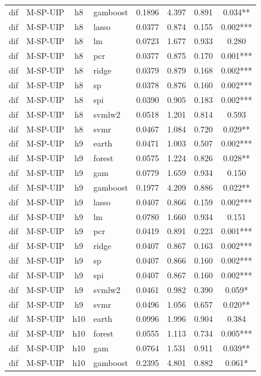 \begin{ThreePartTable}
\begin{longtable}[t]{llclcccc}
dif & M-SP-UIP & h8 & gamboost & 0.1896 & 4.397 & 0.891 & 0.034**\\
dif & M-SP-UIP & h8 & lasso & 0.0377 & 0.874 & 0.155 & 0.002***\\
dif & M-SP-UIP & h8 & lm & 0.0723 & 1.677 & 0.933 & 0.280\\
dif & M-SP-UIP & h8 & pcr & 0.0377 & 0.875 & 0.170 & 0.001***\\
dif & M-SP-UIP & h8 & ridge & 0.0379 & 0.879 & 0.168 & 0.002***\\
dif & M-SP-UIP & h8 & sp & 0.0378 & 0.876 & 0.160 & 0.002***\\
dif & M-SP-UIP & h8 & spi & 0.0390 & 0.905 & 0.183 & 0.002***\\
dif & M-SP-UIP & h8 & svmlw2 & 0.0518 & 1.201 & 0.814 & 0.593\\
dif & M-SP-UIP & h8 & svmr & 0.0467 & 1.084 & 0.720 & 0.029**\\
\addlinespace
dif & M-SP-UIP & h9 & earth & 0.0471 & 1.003 & 0.507 & 0.002***\\
dif & M-SP-UIP & h9 & forest & 0.0575 & 1.224 & 0.826 & 0.028**\\
dif & M-SP-UIP & h9 & gam & 0.0779 & 1.659 & 0.934 & 0.150\\
dif & M-SP-UIP & h9 & gamboost & 0.1977 & 4.209 & 0.886 & 0.022**\\
dif & M-SP-UIP & h9 & lasso & 0.0407 & 0.866 & 0.159 & 0.002***\\
dif & M-SP-UIP & h9 & lm & 0.0780 & 1.660 & 0.934 & 0.151\\
dif & M-SP-UIP & h9 & pcr & 0.0419 & 0.891 & 0.223 & 0.001***\\
dif & M-SP-UIP & h9 & ridge & 0.0407 & 0.867 & 0.163 & 0.002***\\
dif & M-SP-UIP & h9 & sp & 0.0407 & 0.866 & 0.160 & 0.002***\\
dif & M-SP-UIP & h9 & spi & 0.0407 & 0.867 & 0.160 & 0.002***\\
dif & M-SP-UIP & h9 & svmlw2 & 0.0461 & 0.982 & 0.390 & 0.059*\\
dif & M-SP-UIP & h9 & svmr & 0.0496 & 1.056 & 0.657 & 0.020**\\
\addlinespace
dif & M-SP-UIP & h10 & earth & 0.0996 & 1.996 & 0.904 & 0.384\\
dif & M-SP-UIP & h10 & forest & 0.0555 & 1.113 & 0.734 & 0.005***\\
dif & M-SP-UIP & h10 & gam & 0.0764 & 1.531 & 0.911 & 0.039**\\
dif & M-SP-UIP & h10 & gamboost & 0.2395 & 4.801 & 0.882 & 0.061*\\

\end{longtable}
\end{ThreePartTable}
